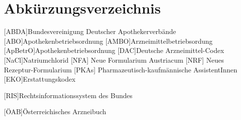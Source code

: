 \documentclass[12pt,a4paper]{article}
\begin{document}
\newpage

%
\printbibliography
\newpage
\section{Abkürzungsverzeichnis}
\begin{acronym}[längsteAbkürzung]
[ABDA]{Bundesvereinigung Deutscher Apothekerverbände}
[ABO]{Apothekenbetriebsordnung}
[AMBO]{Arzneimittelbetriebsordung}
[ApBetrO]{Apothekenbetriebsordnung}
[DAC]{Deutsche Arzneimittel-Codex}
[NaCl]{Natriumchlorid}
[NFA] {Neue Formularium Austriacum}
[NRF] {Neues Rezeptur-Formularium}
[PKAs] {Pharmazeutisch-kaufmännische AssistentInnen}
[EKO]{Erstattungskodex}

[RIS]{Rechtsinformationssystem des Bundes}

[ÖAB]{Österreichisches Arzneibuch}

\end{acronym}
\end{document}
